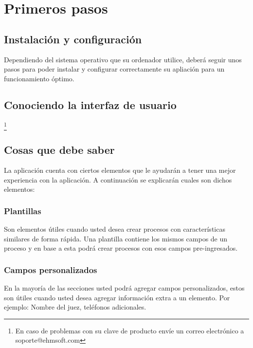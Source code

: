 \chapter{Primeros pasos}
\setcounter{page}{4}

\section{Instalaci\'on y configuraci\'on}
Dependiendo del sistema operativo que su ordenador utilice, deber\'a seguir unos pasos para poder instalar y
configurar correctamente su apliaci\'on para un funcionamiento \'optimo. 
\subsection{\windows}
\subsection{\mac}
\subsection{\linux}
\section{Conociendo la interfaz de usuario}

\footnote{En caso de problemas con su clave de producto env\'ie un correo
electr\'onico a \mbox{soporte@ehmsoft.com}}


\section{Cosas que debe saber}
La aplicaci\'on cuenta con ciertos elementos que le ayudar\'an a tener una
mejor experiencia con la aplicaci\'on. A continuaci\'on se explicar\'an cuales
son dichos elementos:


\subsection{Plantillas}
Son elementos \'utiles cuando usted desea crear procesos con
caracter\'isticas similares de forma r\'apida. Una plantilla contiene los mismos
campos de un proceso y en base a esta podr\'a crear procesos con esos campos
pre-ingresados.
\subsection{Campos personalizados}
En la mayor\'ia de las secciones usted podr\'a agregar campos personalizados, estos son
\'utiles cuando usted desea agregar informaci\'on extra a un elemento. Por
ejemplo: Nombre del juez, tel\'efonos adicionales.
